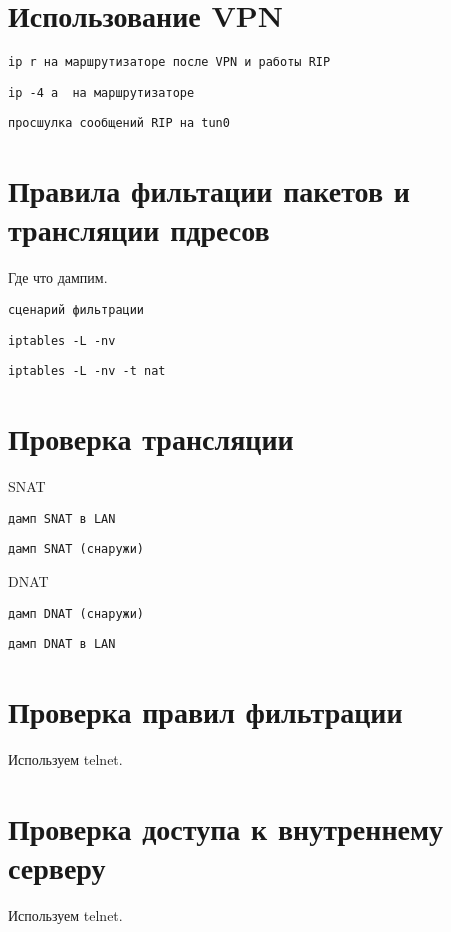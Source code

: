 \documentclass[a4paper,12pt]{article}
\begin{document}
\section{Использование VPN}

\begin{Verbatim}
ip r на маршрутизаторе после VPN и работы RIP
\end{Verbatim}

\begin{Verbatim}
ip -4 a  на маршрутизаторе
\end{Verbatim}

\begin{Verbatim}
просшулка сообщений RIP на tun0
\end{Verbatim}


\section{Правила фильтации пакетов и трансляции пдресов}

Где что дампим.

\begin{Verbatim}
сценарий фильтрации
\end{Verbatim}

\begin{Verbatim}
iptables -L -nv
\end{Verbatim}

\begin{Verbatim}
iptables -L -nv -t nat
\end{Verbatim}

\section{Проверка трансляции}

SNAT

\begin{Verbatim}
дамп SNAT в LAN
\end{Verbatim}

\begin{Verbatim}
дамп SNAT (снаружи)
\end{Verbatim}

DNAT

\begin{Verbatim}
дамп DNAT (снаружи)
\end{Verbatim}

\begin{Verbatim}
дамп DNAT в LAN
\end{Verbatim}


\section{Проверка правил фильтрации}

Используем telnet.

\section{Проверка доступа к внутреннему серверу}

Используем telnet.
\end{document}
